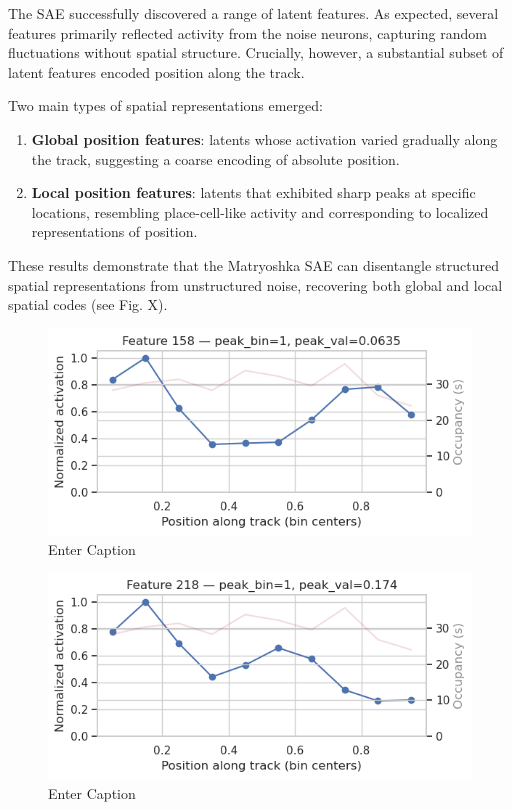 The SAE successfully discovered a range of latent features. As expected, several features primarily reflected activity from the noise neurons, capturing random fluctuations without spatial structure. Crucially, however, a substantial subset of latent features encoded position along the track.

Two main types of spatial representations emerged:
\begin{enumerate}
    \item \textbf{Global position features}: latents whose activation varied gradually along the track, suggesting a coarse encoding of absolute position.
    \item \textbf{Local position features}: latents that exhibited sharp peaks at specific locations, resembling place-cell-like activity and corresponding to localized representations of position.
\end{enumerate}

These results demonstrate that the Matryoshka SAE can disentangle structured spatial representations from unstructured noise, recovering both global and local spatial codes (see Fig. X).

\begin{figure}
    \centering
    \includegraphics[width=0.5\linewidth]{paper/figures/global_position_latent_1.png}
    \caption{Enter Caption}
    \label{fig:placeholder}
\end{figure}

\begin{figure}
    \centering
    \includegraphics[width=0.5\linewidth]{paper/figures/global_position_latent_2.png}
    \caption{Enter Caption}
    \label{fig:placeholder}
\end{figure}